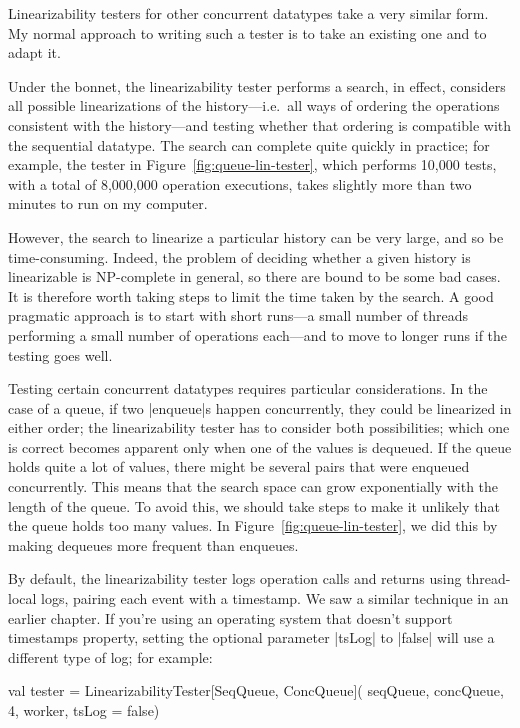 
Linearizability testers for other concurrent datatypes take a very similar
form.  My normal approach to writing such a tester is to take an existing one
and to adapt it.  

Under the bonnet, the linearizability tester performs a search, in effect,
considers all possible linearizations of the history---i.e.~all ways of
ordering the operations consistent with the history---and testing whether that
ordering is compatible with the sequential datatype.  The search can complete
quite quickly in practice; for example, the tester in
Figure~\ref{fig:queue-lin-tester}, which performs 10,000 tests, with a total
of 8,000,000 operation executions, takes slightly more than two minutes to run
on my computer.

However, the search to linearize a particular history can be very large, and
so be time-consuming.  Indeed, the problem of deciding whether a given history
is linearizable is NP-complete in general, so there are bound to be some bad
cases.  It is therefore worth taking steps to limit the time taken by the
search.  A good pragmatic approach is to start with short runs---a small
number of threads performing a small number of operations each---and to move
to longer runs if the testing goes well.

Testing certain concurrent datatypes requires particular considerations.  In
the case of a queue, if two |enqueue|s happen concurrently, they could be
linearized in either order; the linearizability tester has to consider both
possibilities; which one is correct becomes apparent only when one of the
values is dequeued.  If the queue holds quite a lot of values, there might be
several pairs that were enqueued concurrently.  This means that the search
space can grow exponentially with the length of the queue.  To avoid this, we
should take steps to make it unlikely that the queue holds too many values.
In Figure~\ref{fig:queue-lin-tester}, we did this by making dequeues more
frequent than enqueues.

By default, the linearizability tester logs operation calls and returns using
thread-local logs, pairing each event with a timestamp.  We saw a similar
technique in an earlier chapter.  If you're using an operating system that
doesn't support timestamps property, setting the optional parameter |tsLog| to
|false| will use a different type of log; for example:
%
\begin{scala}
  val tester = LinearizabilityTester[SeqQueue, ConcQueue](
    seqQueue, concQueue, 4, worker, tsLog = false)
\end{scala}


